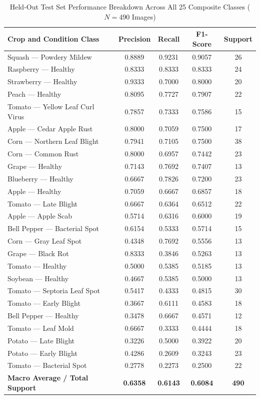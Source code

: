 \documentclass[conference]{IEEEtran}
\begin{document}
\begin{table}[htbp]
\caption{Held-Out Test Set Performance Breakdown Across All 25 Composite Classes ($N=490$ Images)}
\label{tab:per_class_metrics}
\centering
\scriptsize
\begin{tabular}{lcccc}
\toprule
\textbf{Crop and Condition Class} & \textbf{Precision} & \textbf{Recall} & \textbf{F1-Score} & \textbf{Support} \\
\midrule
Squash --- Powdery Mildew & 0.8889 & 0.9231 & 0.9057 & 26 \\
Raspberry --- Healthy & 0.8333 & 0.8333 & 0.8333 & 24 \\
Strawberry --- Healthy & 0.9333 & 0.7000 & 0.8000 & 20 \\
Peach --- Healthy & 0.8095 & 0.7727 & 0.7907 & 22 \\
Tomato --- Yellow Leaf Curl Virus & 0.7857 & 0.7333 & 0.7586 & 15 \\
Apple --- Cedar Apple Rust & 0.8000 & 0.7059 & 0.7500 & 17 \\
Corn --- Northern Leaf Blight & 0.7941 & 0.7105 & 0.7500 & 38 \\
Corn --- Common Rust & 0.8000 & 0.6957 & 0.7442 & 23 \\
Grape --- Healthy & 0.7143 & 0.7692 & 0.7407 & 13 \\
Blueberry --- Healthy & 0.6667 & 0.7826 & 0.7200 & 23 \\
Apple --- Healthy & 0.7059 & 0.6667 & 0.6857 & 18 \\
Tomato --- Late Blight & 0.6667 & 0.6364 & 0.6512 & 22 \\
Apple --- Apple Scab & 0.5714 & 0.6316 & 0.6000 & 19 \\
Bell Pepper --- Bacterial Spot & 0.6154 & 0.5333 & 0.5714 & 15 \\
Corn --- Gray Leaf Spot & 0.4348 & 0.7692 & 0.5556 & 13 \\
Grape --- Black Rot & 0.8333 & 0.3846 & 0.5263 & 13 \\
Tomato --- Healthy & 0.5000 & 0.5385 & 0.5185 & 13 \\
Soybean --- Healthy & 0.4667 & 0.5385 & 0.5000 & 13 \\
Tomato --- Septoria Leaf Spot & 0.5417 & 0.4333 & 0.4815 & 30 \\
Tomato --- Early Blight & 0.3667 & 0.6111 & 0.4583 & 18 \\
Bell Pepper --- Healthy & 0.3478 & 0.6667 & 0.4571 & 12 \\
Tomato --- Leaf Mold & 0.6667 & 0.3333 & 0.4444 & 18 \\
Potato --- Late Blight & 0.3226 & 0.5000 & 0.3922 & 20 \\
Potato --- Early Blight & 0.4286 & 0.2609 & 0.3243 & 23 \\
Tomato --- Bacterial Spot & 0.2778 & 0.2273 & 0.2500 & 22 \\
\midrule
\textbf{Macro Average / Total Support} & \textbf{0.6358} & \textbf{0.6143} & \textbf{0.6084} & \textbf{490} \\
\bottomrule
\end{tabular}
\end{table}
\end{document}

